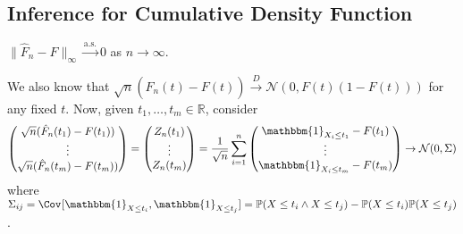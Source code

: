 \subsection{Inference for Cumulative Density Function}

\begin{theorem}\label{thm:Glivenk-Cantelli}
	\(\lVert \hat{F} _n - F \rVert _\infty \overset{\text{a.s.} }{\to} 0\) as \(n \to \infty \).
\end{theorem}

We also know that \(\sqrt{n} (\hat{F} _n(t) - F(t)) \overset{D}{\to} \mathcal{N} (0, F(t) (1 - F(t)))\) for any fixed \(t\). Now, given \(t_1, \dots , t_m \in \mathbb{R} \), consider
\[
	\begin{pmatrix}
		\sqrt{n} (\hat{F} _n(t_1) - F(t_1)) \\
		\vdots                              \\
		\sqrt{n} (\hat{F} _n(t_m) - F(t_m)) \\
	\end{pmatrix}
	= \begin{pmatrix}
		Z_n(t_1) \\
		\vdots   \\
		Z_n(t_m) \\
	\end{pmatrix}
	= \frac{1}{\sqrt{n} } \sum_{i=1}^{n} \begin{pmatrix}
		\mathbbm{1}_{X_i \leq t_1} - F(t_1) \\
		\vdots                              \\
		\mathbbm{1}_{X_i \leq t_m} - F(t_m) \\
	\end{pmatrix}
	\to \mathcal{N} (0, \Sigma )
\]
where \(\Sigma _{ij} = \Cov_{}[\mathbbm{1}_{X \leq t_i} , \mathbbm{1}_{X \leq t_j} ] = \mathbb{P} (X \leq t_i \land X \leq t_j) - \mathbb{P} (X \leq t_i) \mathbb{P} (X \leq t_j)\).
